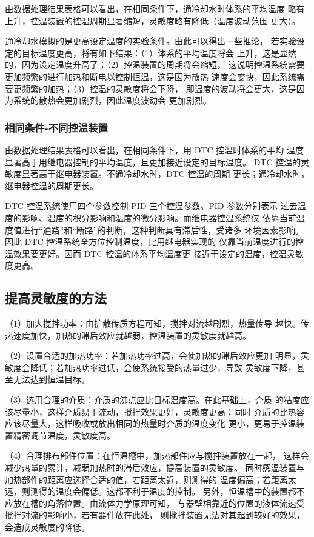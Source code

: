 \documentclass[12pt]{ctexart}
\numberwithin{equation}{section}
\begin{document}
由数据处理结果表格可以看出，在相同条件下，通冷却水时体系的平均温度
略有上升，控温装置的控温周期显著缩短，灵敏度略有降低（温度波动范围
更大）。

通冷却水模拟的是更高设定温度的实验条件。由此可以得出一些推论，
若实验设定的目标温度更高，将有如下结果：（1）体系的平均温度将会
上升，这是显然的，因为设定温度升高了；（2）控温装置的周期将会缩短，
这说明控温系统需要更加频繁的进行加热和断电以控制恒温，这是因为散热
速度会变快，因此系统需要更频繁的加热；（3）控温的灵敏度将会下降，
即温度的波动将会更大，这是因为系统的散热会更加剧烈，因此温度波动会
更加剧烈。

\subsubsection*{相同条件-不同控温装置}

由数据处理结果表格可以看出，在相同条件下，用 DTC 控温时体系的平均
温度显著高于用继电器控制的平均温度，且更加接近设定的目标温度。
DTC 控温的灵敏度显著高于继电器装置。不通冷却水时，DTC 控温的周期
更长；通冷却水时，继电器控温的周期更长。

DTC 控温系统使用四个参数控制 PID 三个控温参数。PID 参数分别表示
过去温度的影响、温度的积分影响和温度的微分影响。而继电器控温系统仅
依靠当前温度值进行“通路”和“断路”的判断，这种判断具有滞后性，受诸多
环境因素影响。因此 DTC 控温系统全方位控制温度，比用继电器实现的
仅靠当前温度进行的控温效果要更好。因而 DTC 控温的体系平均温度更
接近于设定的温度，控温灵敏度更高。

\subsection{提高灵敏度的方法}

（1）加大搅拌功率：由扩散传质方程可知，搅拌对流越剧烈，热量传导
越快。传热速度加快，加热的滞后效应就越弱，控温装置的灵敏度就越高。

（2）设置合适的加热功率：若加热功率过高，会使加热的滞后效应更加
明显，灵敏度会降低；若加热功率过低，会使系统接受的热量过少，导致
灵敏度下降，甚至无法达到恒温目标。

（3）选用合理的介质：介质的沸点应比目标温度高。在此基础上，介质
的粘度应该尽量小，这样介质易于流动，搅拌效果更好，灵敏度更高；同时
介质的比热容应该尽量大，这样吸收或放出相同的热量时介质的温度变化
更小，更易于控温装置精密调节温度，灵敏度高。

（4）合理排布部件位置：在恒温槽中，加热部件应与搅拌装置放在一起，
这样会减少热量的累计，减弱加热时的滞后效应，提高装置的灵敏度。
同时感温装置与加热部件的距离应选择合适的值，若距离太近，则测得的
温度偏高；若距离太远，则测得的温度会偏低。这都不利于温度的控制。
另外，恒温槽中的装置都不应放在槽的角落位置。由流体力学原理可知，
与器壁相靠近的位置的液体流速受搅拌对流的影响小，若有器件放在此处，
则搅拌装置无法对其起到较好的效果，会造成灵敏度的降低。
\end{document}
